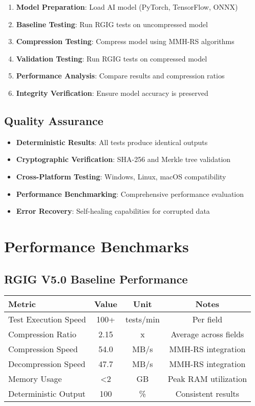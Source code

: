 \documentclass[12pt,a4paper]{article}
\begin{document}
\begin{enumerate}
    \item \textbf{Model Preparation}: Load AI model (PyTorch, TensorFlow, ONNX)
    \item \textbf{Baseline Testing}: Run RGIG tests on uncompressed model
    \item \textbf{Compression Testing}: Compress model using MMH-RS algorithms
    \item \textbf{Validation Testing}: Run RGIG tests on compressed model
    \item \textbf{Performance Analysis}: Compare results and compression ratios
    \item \textbf{Integrity Verification}: Ensure model accuracy is preserved
\end{enumerate}

\subsection{Quality Assurance}
\begin{itemize}
    \item \textbf{Deterministic Results}: All tests produce identical outputs
    \item \textbf{Cryptographic Verification}: SHA-256 and Merkle tree validation
    \item \textbf{Cross-Platform Testing}: Windows, Linux, macOS compatibility
    \item \textbf{Performance Benchmarking}: Comprehensive performance evaluation
    \item \textbf{Error Recovery}: Self-healing capabilities for corrupted data
\end{itemize}

\newpage

\section{Performance Benchmarks}

\subsection{RGIG V5.0 Baseline Performance}
\begin{center}
\begin{tabular}{|l|c|c|c|}
\hline
\textbf{Metric} & \textbf{Value} & \textbf{Unit} & \textbf{Notes} \\
\hline
Test Execution Speed & 100+ & tests/min & Per field \\
Compression Ratio & 2.15 & x & Average across fields \\
Compression Speed & 54.0 & MB/s & MMH-RS integration \\
Decompression Speed & 47.7 & MB/s & MMH-RS integration \\
Memory Usage & <2 & GB & Peak RAM utilization \\
Deterministic Output & 100 & \% & Consistent results \\
\hline
\end{tabular}
\end{center}
\end{document}
